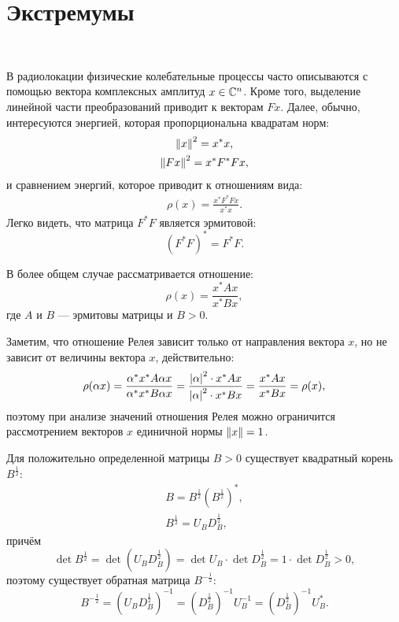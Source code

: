 \section{Экстремумы}~\label{rayleigh:extrema}

В радиолокации физические колебательные процессы часто описываются с помощью вектора комплексных амплитуд $x \in \mathbb{C}^{n}$. Кроме того, выделение линейной части
преобразований приводит к векторам $Fx$. Далее, обычно, интересуются энергией, которая пропорциональна квадратам норм:
\begin{gather*}
    \left \| x \right \|^2 = x^* x , \\
    \left \| F x \right \|^2 = x^* F^* F x ,
\end{gather*}
и сравнением энергий, которое приводит к отношениям вида:
\begin{gather*}
    \rho(x) = \frac{x^* F^* F x}{x^* x}.
\end{gather*}
Легко видеть, что матрица $F^* F$ является эрмитовой:
\[
    ( F^* F )^* = F^* F .
\]

В более общем случае рассматривается отношение:
\[
    \rho(x) = \frac{x^* A x}{x^* B x},
\]
где $A$ и $B$ --- эрмитовы матрицы и $B > 0$.

Заметим, что отношение Релея зависит только от направления вектора $x$, но не зависит от величины вектора $x$, действительно:
\begin{equation}
    \label{rayleight:extrema:homogenity}
    \rho(\alpha x)
    = \frac{\alpha^* x^* A \alpha x}{ \alpha^* x^* B \alpha x}
    = \frac{\left | \alpha \right |^2 \cdot x^* A x}{ \left | \alpha \right |^2 \cdot x^* B x}
    = \frac{x^* A x}{x^* B x}
    = \rho(x) ,
\end{equation}
поэтому при анализе значений отношения Релея можно ограничится рассмотрением векторов $x$ единичной нормы $\left \| x \right \| = 1$.

Для положительно определенной матрицы $B > 0$ существует квадратный корень $B^\frac{1}{2}$:
\begin{gather*}
    B = B^\frac{1}{2} ( B^\frac{1}{2} )^* , \\
    B^\frac{1}{2} = U_B D_B^\frac{1}{2} ,
\end{gather*}
причём
\[
    \det B^\frac{1}{2}
    = \det ( U_B D_B^\frac{1}{2} )
    = \det U_B \cdot \det D_B^\frac{1}{2}
    = 1 \cdot \det D_B^\frac{1}{2}
    > 0 ,
\]
поэтому существует обратная матрица $B^{-\frac{1}{2}}$:
\[
    B^{-\frac{1}{2}}
    = \left ( U_B D_B^\frac{1}{2} \right )^{-1}
    = \left ( D_B^\frac{1}{2} \right )^{-1} U_B^{-1}
    = \left ( D_B^\frac{1}{2} \right )^{-1} U_B^* .
\]

